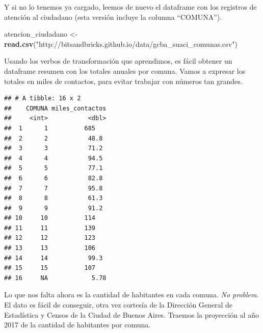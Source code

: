 \documentclass[]{book}
\newenvironment{Shaded}{\begin{snugshade}}{\end{snugshade}}
\newcommand{\KeywordTok}[1]{\textcolor[rgb]{0.13,0.29,0.53}{\textbf{#1}}}
\newcommand{\DataTypeTok}[1]{\textcolor[rgb]{0.13,0.29,0.53}{#1}}
\newcommand{\DecValTok}[1]{\textcolor[rgb]{0.00,0.00,0.81}{#1}}
\newcommand{\StringTok}[1]{\textcolor[rgb]{0.31,0.60,0.02}{#1}}
\newcommand{\OperatorTok}[1]{\textcolor[rgb]{0.81,0.36,0.00}{\textbf{#1}}}
\newcommand{\NormalTok}[1]{#1}
\begin{document}
Y si no lo tenemos ya cargado, leemos de nuevo el dataframe con los
registros de atención al ciudadano (esta versión incluye la columna
``COMUNA'').

\begin{Shaded}
\begin{Highlighting}[]
\NormalTok{atencion_ciudadano <-}\StringTok{ }\KeywordTok{read.csv}\NormalTok{(}\StringTok{"http://bitsandbricks.github.io/data/gcba_suaci_comunas.csv"}\NormalTok{)}
\end{Highlighting}
\end{Shaded}

Usando los verbos de transformación que aprendimos, es fácil obtener un
dataframe resumen con los totales anuales por comuna. Vamos a expresar
los totales en miles de contactos, para evitar trabajar con números tan
grandes.

\begin{Shaded}
\end{Shaded}

\begin{verbatim}
## # A tibble: 16 x 2
##    COMUNA miles_contactos
##     <int>           <dbl>
##  1      1          685   
##  2      2           48.8 
##  3      3           71.2 
##  4      4           94.5 
##  5      5           77.1 
##  6      6           82.8 
##  7      7           95.8 
##  8      8           61.3 
##  9      9           91.2 
## 10     10          114   
## 11     11          139   
## 12     12          123   
## 13     13          106   
## 14     14           99.3 
## 15     15          107   
## 16     NA            5.78
\end{verbatim}

Lo que nos falta ahora es la cantidad de habitantes en cada comuna.
\emph{No problem}. El dato es fácil de conseguir, otra vez cortesía de
la Dirección General de Estadística y Censos de la Ciudad de Buenos
Aires. Traemos la proyección al año 2017 de la cantidad de habitantes
por comuna.
\end{document}
